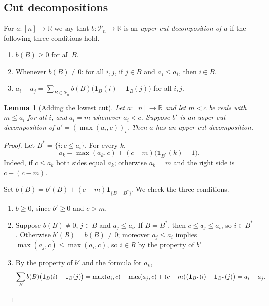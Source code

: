 \documentclass[11pt]{article}
\newtheorem{lemma}[theorem]{Lemma}
\theoremstyle{definition}
\theoremstyle{remark}
\newcommand{\one}{\mathbf{1}}
\newcommand{\R}{\mathbb{R}}
\newcommand{\Pn}{\mathcal{P}_n}
\begin{document}
\subsection{Cut decompositions}

For $a:[n]\to\R$ we say that $b:\Pn\to\R$ is an \emph{upper cut decomposition of $a$} if the following three conditions hold.
\begin{enumerate}
\item $b(B)\ge0$ for all $B$.
\item Whenever $b(B)\ne0$: for all $i,j$, if $j\in B$ and $a_j\le a_i$, then $i\in B$.
\item $a_i-a_j=\sum_{B\in\Pn}b(B)\bigl(\one_B(i)-\one_B(j)\bigr)$ for all $i,j$.
\end{enumerate}

\begin{lemma}[Adding the lowest cut]\label{lem:cut_coord_upper_shift}
Let $a:[n]\to\R$ and let $m<c$ be reals with $m\le a_i$ for all $i$, and $a_i=m$ whenever $a_i<c$. Suppose $b'$ is an upper cut decomposition of $a'=(\max(a_i,c))_i$. Then $a$ has an upper cut decomposition.
\end{lemma}
\begin{proof}
Let $B^*=\{i:c\le a_i\}$. For every $k$,
\[
a_k=\max(a_k,c)+(c-m)\bigl(\one_{B^*}(k)-1\bigr).
\]
Indeed, if $c\le a_k$ both sides equal $a_k$; otherwise $a_k=m$ and the right side is $c-(c-m)$.

Set $b(B)=b'(B)+(c-m)\one_{\{B=B^*\}}$. We check the three conditions.
\begin{enumerate}
\item $b\ge0$, since $b'\ge0$ and $c>m$.
\item Suppose $b(B)\ne0$, $j\in B$ and $a_j\le a_i$. If $B=B^*$, then $c\le a_j\le a_i$, so $i\in B^*$. Otherwise $b'(B)=b(B)\ne0$; moreover $a_j\le a_i$ implies $\max(a_j,c)\le\max(a_i,c)$, so $i\in B$ by the property of $b'$.
\item By the property of $b'$ and the formula for $a_k$,
\[
\sum_Bb(B)\bigl(\one_B(i)-\one_B(j)\bigr)=\max(a_i,c)-\max(a_j,c)+(c-m)\bigl(\one_{B^*}(i)-\one_{B^*}(j)\bigr)=a_i-a_j. \qedhere
\]
\end{enumerate}
\end{proof}
\end{document}
